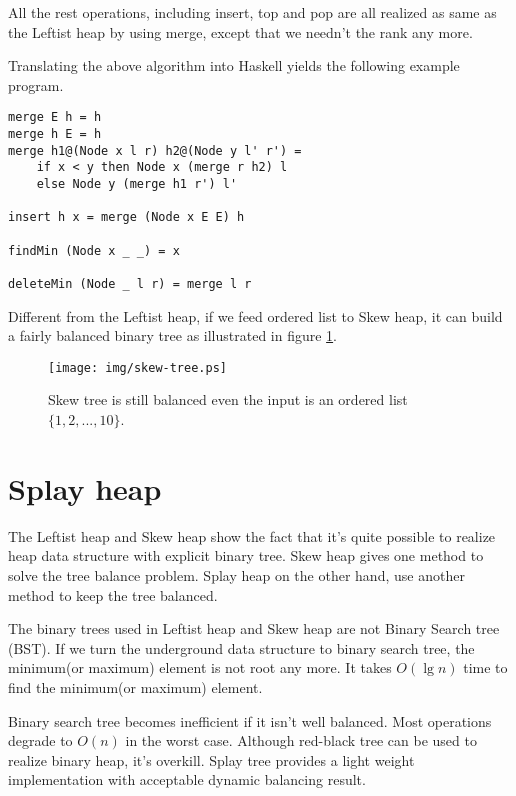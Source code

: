 \documentclass{article}
\begin{document}
All the rest operations, including insert, top and pop are all
realized as same as the Leftist heap by using merge, except that
we needn't the rank any more.

Translating the above algorithm into Haskell yields the following
example program.

\lstset{language=Haskell}
\begin{lstlisting}
merge E h = h
merge h E = h
merge h1@(Node x l r) h2@(Node y l' r') =
    if x < y then Node x (merge r h2) l
    else Node y (merge h1 r') l'

insert h x = merge (Node x E E) h

findMin (Node x _ _) = x

deleteMin (Node _ l r) = merge l r
\end{lstlisting}

Different from the Leftist heap, if we feed ordered list to Skew heap, it can build a
fairly balanced binary tree as illustrated in figure \ref{fig:skew-tree}.

\begin{figure}[htbp]
   \begin{center}
   	  \texttt{[image: img/skew-tree.ps]}
    \caption{Skew tree is still balanced even the input is an ordered list $\{1, 2, ..., 10\}$.}
    \label{fig:skew-tree}
   \end{center}
\end{figure}



\section{Splay heap}
\label{splayheap}

The Leftist heap and Skew heap show the fact that it's quite possible to realize
heap data structure with explicit binary tree.
Skew heap gives one method to solve the tree balance problem. Splay heap
on the other hand, use another method to keep the tree balanced.

The binary trees used in Leftist heap and Skew heap
are not Binary Search tree (BST). If we turn the underground
data structure to binary search tree, the minimum(or maximum)
element is not root any more. It takes $O(\lg n)$ time
to find the minimum(or maximum) element.

Binary search tree becomes inefficient if it isn't well
balanced. Most operations degrade to $O(n)$ in the worst case.
Although red-black tree can be used to realize
binary heap, it's overkill. Splay tree provides a light weight
implementation with acceptable dynamic balancing result.
\end{document}
